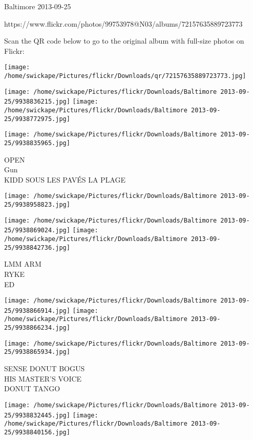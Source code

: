 \documentclass[10pt,letterpaper]{article}
\begin{document}
Baltimore 2013-09-25

https://www.flickr.com/photos/99753978@N03/albums/72157635889723773

Scan the QR code below to go to the original album with full-size photos on Flickr:

\texttt{[image: /home/swickape/Pictures/flickr/Downloads/qr/72157635889723773.jpg]}
\pagebreak

\texttt{[image: /home/swickape/Pictures/flickr/Downloads/Baltimore 2013-09-25/9938836215.jpg]}
\texttt{[image: /home/swickape/Pictures/flickr/Downloads/Baltimore 2013-09-25/9938772975.jpg]}

\vspace{0.25in}
\texttt{[image: /home/swickape/Pictures/flickr/Downloads/Baltimore 2013-09-25/9938835965.jpg]}

OPEN\\
Gun\\
KIDD SOUS LES PAVÉS LA PLAGE
\pagebreak

\texttt{[image: /home/swickape/Pictures/flickr/Downloads/Baltimore 2013-09-25/9938958823.jpg]}

\vspace{0.25in}
\texttt{[image: /home/swickape/Pictures/flickr/Downloads/Baltimore 2013-09-25/9938869024.jpg]}
\texttt{[image: /home/swickape/Pictures/flickr/Downloads/Baltimore 2013-09-25/9938842736.jpg]}

LMM ARM\\
RYKE\\
ED
\pagebreak

\texttt{[image: /home/swickape/Pictures/flickr/Downloads/Baltimore 2013-09-25/9938866914.jpg]}
\texttt{[image: /home/swickape/Pictures/flickr/Downloads/Baltimore 2013-09-25/9938866234.jpg]}

\vspace{0.25in}
\texttt{[image: /home/swickape/Pictures/flickr/Downloads/Baltimore 2013-09-25/9938865934.jpg]}

SENSE DONUT BOGUS\\
HIS MASTER'S VOICE\\
DONUT TANGO
\pagebreak

\texttt{[image: /home/swickape/Pictures/flickr/Downloads/Baltimore 2013-09-25/9938832445.jpg]}
\texttt{[image: /home/swickape/Pictures/flickr/Downloads/Baltimore 2013-09-25/9938840156.jpg]}
\end{document}
